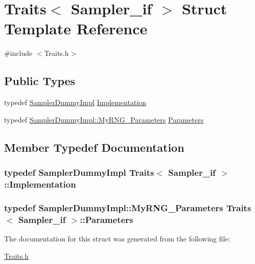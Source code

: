 \hypertarget{struct_traits_3_01_sampler__if_01_4}{}\section{Traits$<$ Sampler\+\_\+if $>$ Struct Template Reference}
\label{struct_traits_3_01_sampler__if_01_4}


{\ttfamily \#include $<$Traits.\+h$>$}

\subsection*{Public Types}
\begin{DoxyCompactItemize}
\item 
typedef \hyperlink{class_sampler_dummy_impl}{Sampler\+Dummy\+Impl} \hyperlink{struct_traits_3_01_sampler__if_01_4_aead486ab1a33eaf94057a809558d1869}{Implementation}
\item 
typedef \hyperlink{class_sampler_dummy_impl_1_1_my_r_n_g___parameters}{Sampler\+Dummy\+Impl\+::\+My\+R\+N\+G\+\_\+\+Parameters} \hyperlink{struct_traits_3_01_sampler__if_01_4_a1d090ad5a8c6c3554e5ad4361210eb00}{Parameters}
\end{DoxyCompactItemize}


\subsection{Member Typedef Documentation}
\subsubsection[{\texorpdfstring{Implementation}{Implementation}}]{\setlength{\rightskip}{0pt plus 5cm}typedef {\bf Sampler\+Dummy\+Impl} {\bf Traits}$<$ {\bf Sampler\+\_\+if} $>$\+::{\bf Implementation}}\hypertarget{struct_traits_3_01_sampler__if_01_4_aead486ab1a33eaf94057a809558d1869}{}\label{struct_traits_3_01_sampler__if_01_4_aead486ab1a33eaf94057a809558d1869}
\subsubsection[{\texorpdfstring{Parameters}{Parameters}}]{\setlength{\rightskip}{0pt plus 5cm}typedef {\bf Sampler\+Dummy\+Impl\+::\+My\+R\+N\+G\+\_\+\+Parameters} {\bf Traits}$<$ {\bf Sampler\+\_\+if} $>$\+::{\bf Parameters}}\hypertarget{struct_traits_3_01_sampler__if_01_4_a1d090ad5a8c6c3554e5ad4361210eb00}{}\label{struct_traits_3_01_sampler__if_01_4_a1d090ad5a8c6c3554e5ad4361210eb00}


The documentation for this struct was generated from the following file\+:\begin{DoxyCompactItemize}
\item 
\hyperlink{_traits_8h}{Traits.\+h}\end{DoxyCompactItemize}
